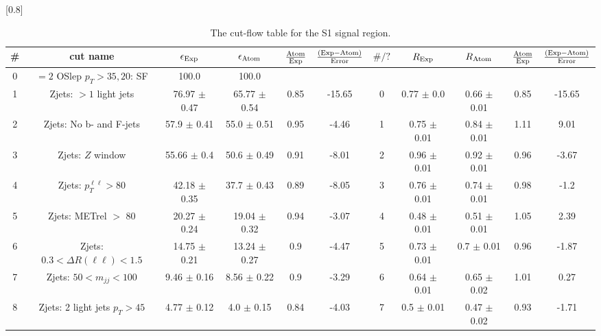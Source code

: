 \documentclass[12pt]{article}
\begin{document}
\renewcommand{\arraystretch}{1.3}
\begin{table}[h!]
\begin{center}
\scalebox{0.7}[0.8]{ 
\begin{tabular}{c|c||c|c|>{\columncolor{yellow}}c|c||c|c|c|>{\columncolor{yellow}}c|c}
\hline
\# & cut name & $\epsilon_{\rm Exp}$ & $\epsilon_{\rm Atom}$ & $\frac{\rm Atom}{\rm Exp}$ & $\frac{({\rm Exp} - {\rm Atom})}{\rm Error}$ & $\#/?$ & $R_{\rm Exp}$ & $R_{\rm Atom}$ & $\frac{\rm Atom}{\rm Exp}$ & $\frac{({\rm Exp} - {\rm Atom})}{\rm Error}$ \\
\hline
0 & $= 2$ OSlep $p_T > 35, 20$: SF & 100.0   & 100.0   &  &  &  &   &   &  &  \\
1 & Zjets: $> 1$ light jets & 76.97 $\pm$ 0.47 & 65.77 $\pm$ 0.54 & 0.85 & -15.65 & 0 & 0.77 $\pm$ 0.0 & 0.66 $\pm$ 0.01 & 0.85 & -15.65 \\
2 & Zjets: No b- and F-jets & 57.9 $\pm$ 0.41 & 55.0 $\pm$ 0.51 & 0.95 & -4.46 & 1 & 0.75 $\pm$ 0.01 & 0.84 $\pm$ 0.01 & 1.11 & 9.01 \\
3 & Zjets: $Z$ window & 55.66 $\pm$ 0.4 & 50.6 $\pm$ 0.49 & 0.91 & -8.01 & 2 & 0.96 $\pm$ 0.01 & 0.92 $\pm$ 0.01 & 0.96 & -3.67 \\
4 & Zjets: $p_T^{\ell \ell} > 80$ & 42.18 $\pm$ 0.35 & 37.7 $\pm$ 0.43 & 0.89 & -8.05 & 3 & 0.76 $\pm$ 0.01 & 0.74 $\pm$ 0.01 & 0.98 & -1.2 \\
5 & Zjets: METrel $>$ 80 & 20.27 $\pm$ 0.24 & 19.04 $\pm$ 0.32 & 0.94 & -3.07 & 4 & 0.48 $\pm$ 0.01 & 0.51 $\pm$ 0.01 & 1.05 & 2.39 \\
6 & Zjets: $0.3 < \Delta R (\ell \ell) < 1.5$ & 14.75 $\pm$ 0.21 & 13.24 $\pm$ 0.27 & 0.9 & -4.47 & 5 & 0.73 $\pm$ 0.01 & 0.7 $\pm$ 0.01 & 0.96 & -1.87 \\
7 & Zjets: $50 < m_{jj} < 100$ & 9.46 $\pm$ 0.16 & 8.56 $\pm$ 0.22 & 0.9 & -3.29 & 6 & 0.64 $\pm$ 0.01 & 0.65 $\pm$ 0.02 & 1.01 & 0.27 \\
8 & Zjets: 2 light jets $p_T > 45$ & 4.77 $\pm$ 0.12 & 4.0 $\pm$ 0.15 & 0.84 & -4.03 & 7 & 0.5 $\pm$ 0.01 & 0.47 $\pm$ 0.02 & 0.93 & -1.71 \\
\hline
\end{tabular}
}
\caption{\small 
        The cut-flow table for the S1 signal region.
    }
\label{tab:cflow_Zjets_250}
\end{center}
\label{default}
\end{table}

        
        
\end{document}
